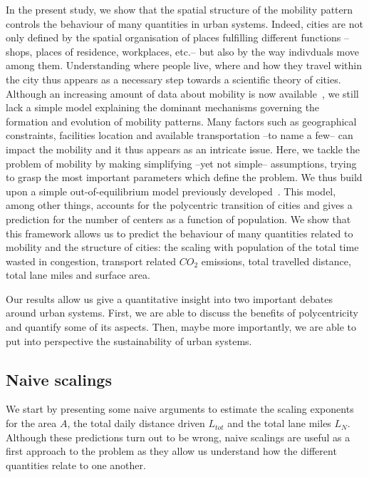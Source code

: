 In the present study, we show that the spatial structure of the mobility pattern controls the behaviour of many quantities in urban systems. Indeed, cities are not only defined by the spatial organisation of places fulfilling different functions --shops, places of residence, workplaces, etc.-- but also by the way indivduals move among them. Understanding where people live, where and how they travel within the city thus appears as a necessary step towards a scientific theory of cities.\\ 

Although an increasing amount of data about mobility is now available~\cite{Gonzalez:2008}, we still lack a simple model explaining the dominant mechanisms governing the formation and evolution of mobility patterns. Many factors such as geographical constraints, facilities location and available transportation --to name a few-- can impact the mobility and it thus appears as an intricate issue. Here, we tackle the problem of mobility by making simplifying --yet not simple-- assumptions, trying to grasp the most important parameters which define the problem. We thus build upon a simple out-of-equilibrium model previously developed~\cite{Louf:2013}. This model, among other things, accounts for the polycentric transition of cities and gives a prediction for the number of centers as a function of population. We show that this framework allows us to predict the behaviour of many quantities related to mobility and the structure of cities: the scaling with population of the total time wasted in congestion, transport related $CO_2$ emissions, total travelled distance, total lane miles and surface area.

Our results allow us give a quantitative insight into two important debates around urban systems. First, we are able to discuss the benefits of polycentricity and quantify some of its aspects. Then, maybe more importantly, we are able to put into perspective the sustainability of urban systems.


\subsection{Naive scalings}

We start by presenting some naive arguments to estimate the scaling exponents for the area $A$, the total daily distance driven $L_{tot}$ and the total lane miles $L_N$. Although these predictions turn out to be wrong, naive scalings are useful as a first approach to the problem as they allow us understand how the different quantities relate to one another.


